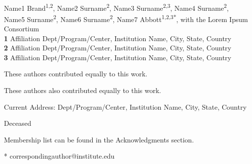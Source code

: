 \documentclass[10pt,letterpaper]{article}
\begin{document}
\vspace*{0.2in}

\begin{flushleft}
{\Large
\textbf{} %
}
\newline
\\
Name1 Brand\textsuperscript{1,2\Yinyang},
Name2 Surname\textsuperscript{2\Yinyang},
Name3 Surname\textsuperscript{2,3\textcurrency},
Name4 Surname\textsuperscript{2},
Name5 Surname\textsuperscript{2\ddag},
Name6 Surname\textsuperscript{2\ddag},
Name7 Abbott\textsuperscript{1,2,3*},
with the Lorem Ipsum Consortium\textsuperscript{\textpilcrow}
\\
\bigskip
\textbf{1} Affiliation Dept/Program/Center, Institution Name, City, State, Country
\\
\textbf{2} Affiliation Dept/Program/Center, Institution Name, City, State, Country
\\
\textbf{3} Affiliation Dept/Program/Center, Institution Name, City, State, Country
\\
\bigskip

% 
%
\Yinyang These authors contributed equally to this work.

\ddag These authors also contributed equally to this work.

\textcurrency Current Address: Dept/Program/Center, Institution Name, City, State, Country %

\dag Deceased

\textpilcrow Membership list can be found in the Acknowledgments section.

* correspondingauthor@institute.edu

\end{flushleft}
\end{document}
